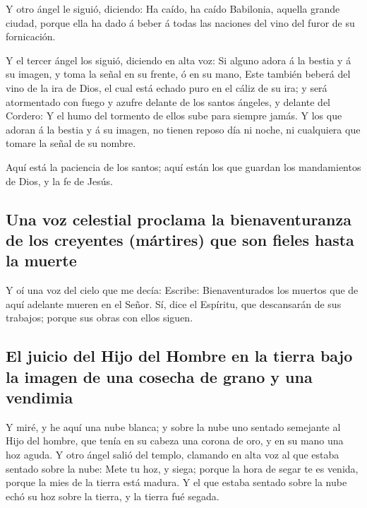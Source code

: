  Y otro ángel le siguió, diciendo: Ha caído, ha caído
Babilonia, aquella grande ciudad, porque ella ha dado á beber á todas
las naciones del vino del furor de su fornicación.

 Y el tercer ángel los siguió, diciendo en alta voz: Si
alguno adora á la bestia y á su imagen, y toma la señal en su frente, ó
en su mano,  Este también beberá del vino de la ira de
Dios, el cual está echado puro en el cáliz de su ira; y será atormentado
con fuego y azufre delante de los santos ángeles, y delante del Cordero:
 Y el humo del tormento de ellos sube para siempre jamás.
Y los que adoran á la bestia y á su imagen, no tienen reposo día ni
noche, ni cualquiera que tomare la señal de su nombre.

 Aquí está la paciencia de los santos; aquí están los que
guardan los mandamientos de Dios, y la fe de Jesús.

\hypertarget{una-voz-celestial-proclama-la-bienaventuranza-de-los-creyentes-muxe1rtires-que-son-fieles-hasta-la-muerte}{%
\subsection{Una voz celestial proclama la bienaventuranza de los
creyentes (mártires) que son fieles hasta la
muerte}\label{una-voz-celestial-proclama-la-bienaventuranza-de-los-creyentes-muxe1rtires-que-son-fieles-hasta-la-muerte}}

 Y oí una voz del cielo que me decía: Escribe:
Bienaventurados los muertos que de aquí adelante mueren en el Señor. Sí,
dice el Espíritu, que descansarán de sus trabajos; porque sus obras con
ellos siguen.

\hypertarget{el-juicio-del-hijo-del-hombre-en-la-tierra-bajo-la-imagen-de-una-cosecha-de-grano-y-una-vendimia}{%
\subsection{El juicio del Hijo del Hombre en la tierra bajo la imagen de
una cosecha de grano y una
vendimia}\label{el-juicio-del-hijo-del-hombre-en-la-tierra-bajo-la-imagen-de-una-cosecha-de-grano-y-una-vendimia}}

 Y miré, y he aquí una nube blanca; y sobre la nube uno
sentado semejante al Hijo del hombre, que tenía en su cabeza una corona
de oro, y en su mano una hoz aguda.  Y otro ángel salió
del templo, clamando en alta voz al que estaba sentado sobre la nube:
Mete tu hoz, y siega; porque la hora de segar te es venida, porque la
mies de la tierra está madura.  Y el que estaba sentado
sobre la nube echó su hoz sobre la tierra, y la tierra fué segada.

